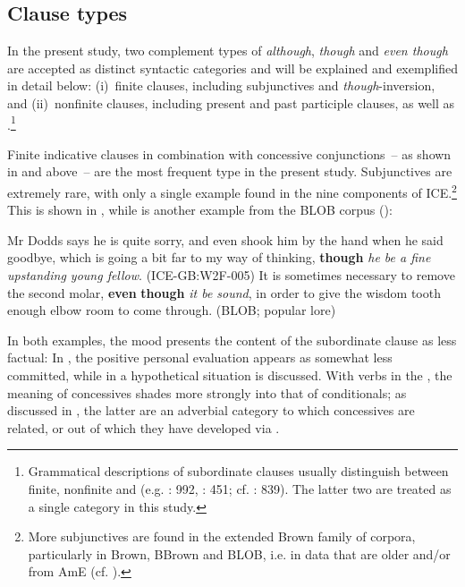 \subsection{\label{bkm:Ref35178961}\label{bkm:Ref35269006}\label{bkm:Ref35363629}\label{bkm:Ref35418089}\label{bkm:Ref35769817}Clause types}\label{sec:2.3.2}

In the present study, two complement types of \textit{although}, \textit{though} and \textit{even though} are accepted as distinct syntactic categories and will be explained and exemplified in detail below:
(i)~finite clauses, including subjunctives and \textit{though}-in\-ver\-sion, and
(ii)~nonfinite clauses, including present and past participle clauses, as well as .\footnote{Grammatical descriptions of subordinate clauses usually distinguish between finite, nonfinite and  (e.g. \citealt{QuirkEtAl1985}: 992, \citealt{Diessel2005}: 451; cf. \citealt{Givón1990}: 839). The latter two are treated as a single category in this study.}

Finite indicative clauses in combination with concessive conjunctions~– as shown in  and  above~– are the most frequent type in the present study. Subjunctives are extremely rare, with only a single example found in the nine components of ICE.\footnote{More subjunctives are found in the extended Brown family of corpora, particularly in Brown, BBrown and BLOB, i.e. in data that are older and/or from AmE (cf. \citealt{Crawford2009,Kjellmer2009,Schlüter2009}).} This is shown in , while  is another example from the BLOB corpus (\citealt{LeechSmith2005}):\largerpage

\ea\label{ex:31}   \label{bkm:Ref489781174}Mr Dodds says he is quite sorry, and even shook him by the hand when he said goodbye, which is going a bit far to my way of thinking, \textbf{though} \textit{he be a fine upstanding young fellow}. (ICE-GB:W2F-005)
\ex\label{ex:32} \label{bkm:Ref489781592}It is sometimes necessary to remove the second molar, \textbf{even} \textbf{though} \textit{it be sound}, in order to give the wisdom tooth enough elbow room to come through. (BLOB; popular lore)\\
\z

In both examples, the  mood presents the content of the subordinate clause as less factual: In , the positive personal evaluation appears as somewhat less committed, while in  a hypothetical situation is discussed. With verbs in the , the meaning of concessives shades more strongly into that of conditionals; as discussed in , the latter are an adverbial category to which concessives are related, or out of which they have developed via .

